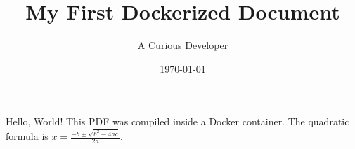 \documentclass{article}
\title{My First Dockerized Document}
\author{A Curious Developer}
\date{\today}
\begin{document}
\maketitle
Hello, World! This PDF was compiled inside a Docker container.
The quadratic formula is $x = \frac{-b \pm \sqrt{b^2-4ac}}{2a}$.
\end{document}
